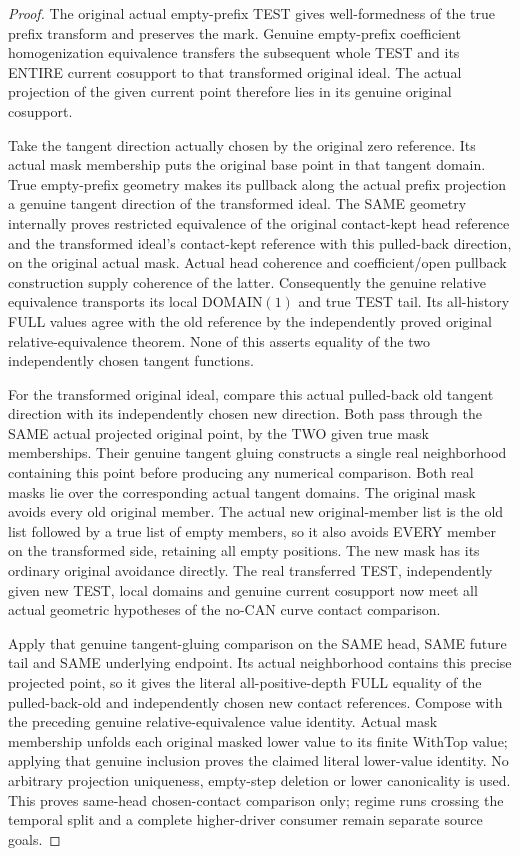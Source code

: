 \begin{proof}
The original actual empty-prefix TEST gives well-formedness of the true
prefix transform and preserves the mark. Genuine empty-prefix coefficient
homogenization equivalence transfers the subsequent whole TEST and its
ENTIRE current cosupport to that transformed original ideal. The actual
projection of the given current point therefore lies in its genuine
original cosupport.

Take the tangent direction actually chosen by the original zero reference.
Its actual mask membership puts the original base point in that tangent
domain. True empty-prefix geometry makes its pullback along the actual
prefix projection a genuine tangent direction of the transformed ideal.
The SAME geometry internally proves restricted equivalence of the original
contact-kept head reference and the transformed ideal's contact-kept
reference with this pulled-back direction, on the original actual mask.
Actual head coherence and coefficient/open pullback construction supply
coherence of the latter. Consequently the genuine relative equivalence
transports its local DOMAIN$(1)$ and true TEST tail. Its all-history FULL
values agree with the old reference by the independently proved original
relative-equivalence theorem. None of this asserts equality of the two
independently chosen tangent functions.

For the transformed original ideal, compare this actual pulled-back old
tangent direction with its independently chosen new direction. Both pass
through the SAME actual projected original point, by the TWO given true
mask memberships. Their genuine tangent gluing constructs a single real
neighborhood containing this point before producing any numerical
comparison. Both real masks lie over the corresponding actual tangent
domains. The original mask avoids every old original member. The actual
new original-member list is the old list followed by a true list of
empty members, so it also avoids EVERY member on the transformed side,
retaining all empty positions. The new mask has its ordinary original
avoidance directly. The real transferred TEST, independently given new
TEST, local domains and genuine current cosupport now meet all actual
geometric hypotheses of the no-CAN curve contact comparison.

Apply that genuine tangent-gluing comparison on the SAME head, SAME
future tail and SAME underlying endpoint. Its actual neighborhood contains
this precise projected point, so it gives the literal all-positive-depth
FULL equality of the pulled-back-old and independently chosen new contact
references. Compose with the preceding genuine relative-equivalence value
identity. Actual mask membership unfolds each original masked lower value
to its finite WithTop value; applying that genuine inclusion proves the
claimed literal lower-value identity. No arbitrary projection uniqueness,
empty-step deletion or lower canonicality is used. This proves same-head
chosen-contact comparison only; regime runs crossing the temporal split
and a complete higher-driver consumer remain separate source goals.
\end{proof}
